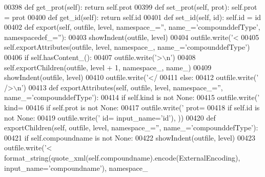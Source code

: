\begin{DoxyCode}
{{{{{{{{{{{{{{{{{{{{{{{{00398     \textcolor{keyword}{def }get_prot(self): \textcolor{keywordflow}{return} self.prot
00399     \textcolor{keyword}{def }set_prot(self, prot): self.prot = prot
00400     \textcolor{keyword}{def }get_id(self): \textcolor{keywordflow}{return} self.id
00401     \textcolor{keyword}{def }set_id(self, id): self.id = id
00402     \textcolor{keyword}{def }export(self, outfile, level, namespace\_='', name\_='compounddefType', namespacedef\_=''):
00403         showIndent(outfile, level)
00404         outfile.write(\textcolor{stringliteral}{'<%
00405         self.exportAttributes(outfile, level, namespace\_, name\_=\textcolor{stringliteral}{'compounddefType'})
00406         \textcolor{keywordflow}{if} self.hasContent_():
00407             outfile.write(\textcolor{stringliteral}{'>\(\backslash\)n'})
00408             self.exportChildren(outfile, level + 1, namespace\_, name\_)
00409             showIndent(outfile, level)
00410             outfile.write(\textcolor{stringliteral}{'</%
00411         \textcolor{keywordflow}{else}:
00412             outfile.write(\textcolor{stringliteral}{' />\(\backslash\)n'})
00413     \textcolor{keyword}{def }exportAttributes(self, outfile, level, namespace\_='', name\_='compounddefType'):
00414         \textcolor{keywordflow}{if} self.kind \textcolor{keywordflow}{is} \textcolor{keywordflow}{not} \textcolor{keywordtype}{None}:
00415             outfile.write(\textcolor{stringliteral}{' kind=%
00416         \textcolor{keywordflow}{if} self.prot \textcolor{keywordflow}{is} \textcolor{keywordflow}{not} \textcolor{keywordtype}{None}:
00417             outfile.write(\textcolor{stringliteral}{' prot=%
00418         \textcolor{keywordflow}{if} self.id \textcolor{keywordflow}{is} \textcolor{keywordflow}{not} \textcolor{keywordtype}{None}:
00419             outfile.write(\textcolor{stringliteral}{' id=%
      input\_name=\textcolor{stringliteral}{'id'}), ))
00420     \textcolor{keyword}{def }exportChildren(self, outfile, level, namespace\_='', name\_='compounddefType'):
00421         \textcolor{keywordflow}{if} self.compoundname \textcolor{keywordflow}{is} \textcolor{keywordflow}{not} \textcolor{keywordtype}{None}:
00422             showIndent(outfile, level)
00423             outfile.write(\textcolor{stringliteral}{'<%
      format_string(quote_xml(self.compoundname).encode(ExternalEncoding), input\_name=\textcolor{stringliteral}{'compoundname'}), namespace\_
}}}}}}}}}}}}}}}}}}}}}}}}}}}}}}
\end{DoxyCode}
